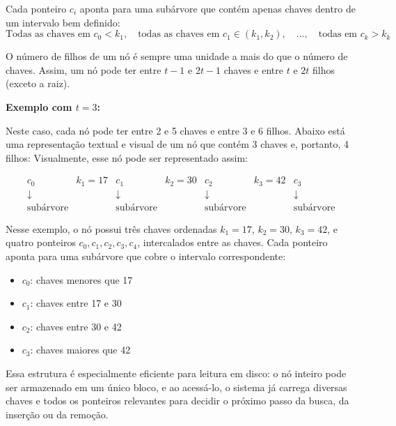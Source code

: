 Cada ponteiro \( c_i \) aponta para uma subárvore que contém apenas chaves dentro de um intervalo bem definido:
\[
\text{Todas as chaves em } c_0 < k_1,\quad \text{todas as chaves em } c_1 \in (k_1, k_2),\quad \dots,\quad \text{todas em } c_k > k_k
\]

O número de filhos de um nó é sempre uma unidade a mais do que o número de chaves. 
Assim, um nó pode ter entre \( t - 1 \) e \( 2t - 1 \) chaves e entre \( t \) e \( 2t \) filhos (exceto a raiz).

\vspace{1em}
\textbf{Exemplo com \( t = 3 \):}

Neste caso, cada nó pode ter entre 2 e 5 chaves e entre 3 e 6 filhos. 
Abaixo está uma representação textual e visual de um nó que contém 3 chaves e, portanto, 4 filhos:
\vspace{1em}
Visualmente, esse nó pode ser representado assim:

\[
\begin{array}{cccccccccccc}
  \boxed{c_0}      &  k_1 = 17 & \boxed{c_1}       &  k_2 = 30 & \boxed{c_2}      &  k_3 = 42 & \boxed{c_3}        \\
   \downarrow      &           & \downarrow        &           & \downarrow       &           & \downarrow         \\
  \text{subárvore} &           & \text{subárvore}  &           & \text{subárvore} &           & \text{subárvore}
\end{array}
\]


Nesse exemplo, o nó possui três chaves ordenadas \( k_1 = 17 \), \( k_2 = 30 \), \( k_3 = 42 \), e quatro ponteiros \( c_0, c_1, c_2, c_3, c_4 \), intercalados entre as chaves. 
Cada ponteiro aponta para uma subárvore que cobre o intervalo correspondente:
\begin{itemize}
  \item \( c_0 \): chaves menores que 17
  \item \( c_1 \): chaves entre 17 e 30
  \item \( c_2 \): chaves entre 30 e 42
  \item \( c_3 \): chaves maiores que 42
\end{itemize}

Essa estrutura é especialmente eficiente para leitura em disco: o nó inteiro pode ser armazenado em um único bloco, e ao acessá-lo, o sistema já carrega diversas chaves e todos os ponteiros relevantes para decidir o próximo passo da busca, da inserção ou da remoção.

